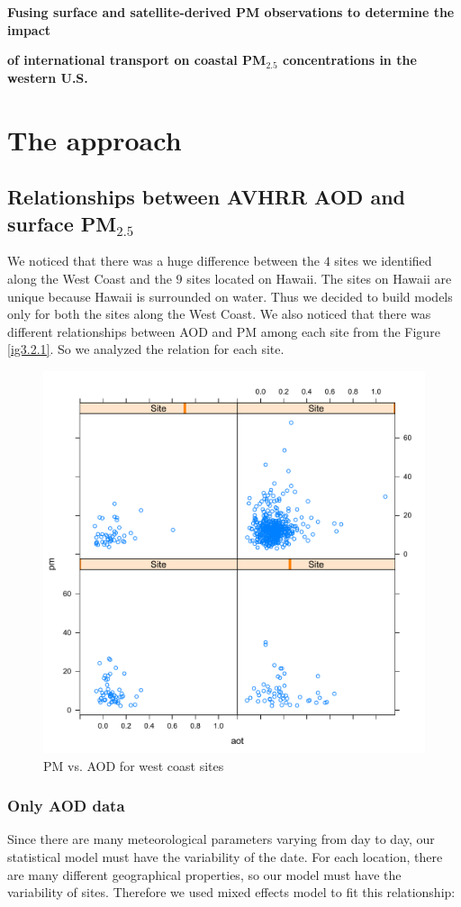 \documentclass[10pt]{article}
\begin{document}
\centerline{\large \bf Fusing surface and satellite-derived PM observations to determine the impact } 

\centerline{\large \bf of international transport on coastal PM$_{2.5}$ concentrations in the western U.S.}


\vspace{.3truein}
\section{The approach}

\subsection{Relationships between AVHRR AOD and surface PM$_{2.5}$}
We noticed that there was a huge difference between the  $4$ sites we identified along the West Coast and the $9$ sites located on Hawaii. The sites on Hawaii are unique because Hawaii is surrounded on water. Thus we decided to build models only for both the sites along the West Coast. We also noticed that there was different relationships between AOD and PM among each site from the Figure \ref{ig3.2.1}. So we analyzed the relation for each site. 

\begin{figure}[!h]
\centering
\includegraphics[width = 0.6\linewidth]{3.pdf}
\caption{PM vs. AOD for west coast sites}
\label{fig3.2.1}
\end{figure}


\subsubsection{Only AOD data}
Since there are many meteorological parameters varying from day to day, our statistical model must have the variability of the date. For each location, there are many different geographical properties, so our model must have the variability of sites. Therefore we used mixed effects model to fit this relationship:
\end{document}
